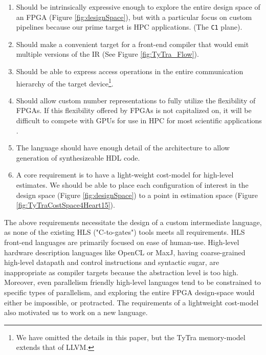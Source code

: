 \documentclass[]{heart2015_WN4Pre}
\begin{document}
\begin{enumerate}
	\item Should be intrinsically expressive enough to explore the entire design space of an FPGA (Figure \ref{fig:designSpace}), but with a particular focus on custom pipelines because our prime target is HPC applications\cite{112.152}. (The \texttt{C1} plane).

	\item Should make a convenient target for a front-end compiler that would emit multiple versions of the IR (See Figure \ref{fig:TyTra_Flow}).
	
	\item Should be able to express access operations in the entire communication hierarchy of the target device\footnote{We have omitted the details in this paper, but the TyTra memory-model extends that of LLVM.}.
	
	\item Should allow custom number representations to fully utilize the flexibility of FPGAs. If this flexibility offered by FPGAs is not capitalized on, it will be difficult to compete with GPUs for use in HPC for most scientific applications \cite{130.w1a_02}.
	
	\item The language should have enough detail of the architecture to allow generation of synthesizeable HDL code.
	
	\item A core requirement is to have a light-weight cost-model for high-level estimates. We should be able to place each configuration of interest in the design space (Figure \ref{fig:designSpace}) to a point in estimation space (Figure \ref{fig:TyTraCostSpace4Heart15}).
	
\end{enumerate}





The above requirements necessitate the design of a custom intermediate language, as none of the existing HLS ("C-to-gates") tools meets all requirements. HLS front-end languages are primarily focused on ease of human-use. High-level hardware description languages like OpenCL or MaxJ\cite{123.024}, having coarse-grained high-level datapath and control instructions and syntactic sugar, are inappropriate as compiler targets because the abstraction level is too high. Moreover, even parallelism friendly high-level languages tend to be constrained to specific types of parallelism, and exploring the entire FPGA design-space would either be impossible, or protracted. The requirements of a lightweight cost-model also motivated us to work on a new language.
\end{document}
